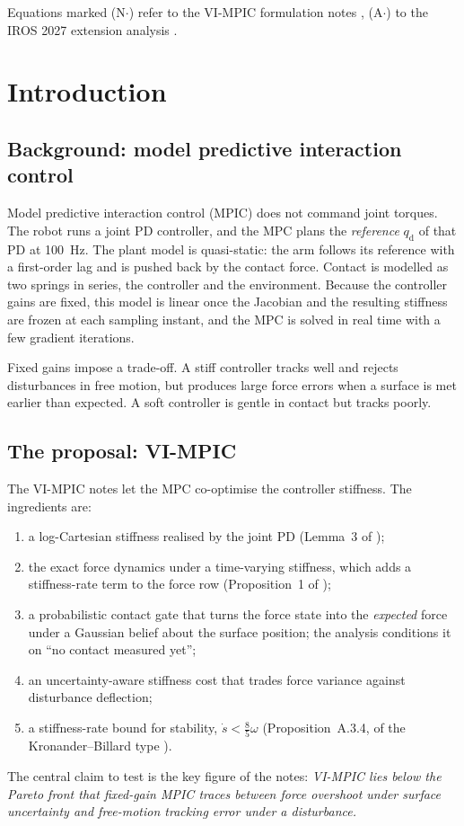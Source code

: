 \documentclass[11pt,a4paper]{article}
\newcommand{\qd}{q_{\mathrm{d}}}
\begin{document}
Equations marked (N$\cdot$) refer to the VI-MPIC formulation notes \cite{notes}, (A$\cdot$) to the IROS 2027
extension analysis \cite{analysis}.

\section{Introduction}

\subsection{Background: model predictive interaction control}
Model predictive interaction control (MPIC) \cite{gold2023} does not command joint torques. The robot
runs a joint PD controller, and the MPC plans the \emph{reference} $\qd$ of that PD at \SI{100}{Hz}. The
plant model is quasi-static: the arm follows its reference with a first-order lag and is pushed back by
the contact force. Contact is modelled as two springs in series, the controller and the environment.
Because the controller gains are fixed, this model is linear once the Jacobian and the resulting
stiffness are frozen at each sampling instant, and the MPC is solved in real time with a few gradient
iterations.

Fixed gains impose a trade-off. A stiff controller tracks well and rejects disturbances in free motion,
but produces large force errors when a surface is met earlier than expected. A soft controller is gentle
in contact but tracks poorly.

\subsection{The proposal: VI-MPIC}
The VI-MPIC notes \cite{notes} let the MPC co-optimise the controller stiffness. The ingredients are:
\begin{enumerate}[label=(\roman*)]
\item a log-Cartesian stiffness realised by the joint PD (Lemma~3 of \cite{notes});
\item the exact force dynamics under a time-varying stiffness, which adds a stiffness-rate term to the
  force row (Proposition~1 of \cite{notes});
\item a probabilistic contact gate that turns the force state into the \emph{expected} force under a
  Gaussian belief about the surface position; the analysis \cite{analysis} conditions it on ``no contact
  measured yet'';
\item an uncertainty-aware stiffness cost that trades force variance against disturbance deflection;
\item a stiffness-rate bound for stability, $\dot s<\tfrac{8}{5}\omega$ (Proposition~A.3.4, of the
  Kronander--Billard type \cite{kronander}).
\end{enumerate}
The central claim to test is the key figure of the notes: \emph{VI-MPIC lies below the Pareto front that
fixed-gain MPIC traces between force overshoot under surface uncertainty and free-motion tracking error
under a disturbance.}
\end{document}

